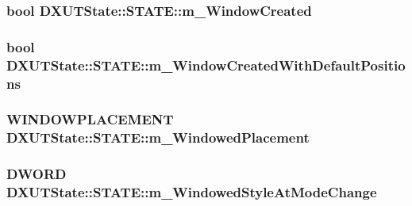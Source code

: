 \label{struct_d_x_u_t_state_1_1_s_t_a_t_e_ac091b80c8b43d3ace8727ec1a4f80739}
\hypertarget{struct_d_x_u_t_state_1_1_s_t_a_t_e_a1de1e982998068a26fb2f72bfdcecc0f}{
\subsubsection[{m\_\-WindowCreated}]{\setlength{\rightskip}{0pt plus 5cm}bool {\bf DXUTState::STATE::m\_\-WindowCreated}}}
\label{struct_d_x_u_t_state_1_1_s_t_a_t_e_a1de1e982998068a26fb2f72bfdcecc0f}
\hypertarget{struct_d_x_u_t_state_1_1_s_t_a_t_e_a1016f7d74385e9d74b86c6d8fe53176a}{
\subsubsection[{m\_\-WindowCreatedWithDefaultPositions}]{\setlength{\rightskip}{0pt plus 5cm}bool {\bf DXUTState::STATE::m\_\-WindowCreatedWithDefaultPositions}}}
\label{struct_d_x_u_t_state_1_1_s_t_a_t_e_a1016f7d74385e9d74b86c6d8fe53176a}
\hypertarget{struct_d_x_u_t_state_1_1_s_t_a_t_e_ad309dfdf17c0d15b5b0e154b91074eb9}{
\subsubsection[{m\_\-WindowedPlacement}]{\setlength{\rightskip}{0pt plus 5cm}WINDOWPLACEMENT {\bf DXUTState::STATE::m\_\-WindowedPlacement}}}
\label{struct_d_x_u_t_state_1_1_s_t_a_t_e_ad309dfdf17c0d15b5b0e154b91074eb9}
\hypertarget{struct_d_x_u_t_state_1_1_s_t_a_t_e_a87749bb43ec8abb327a2db7f7353f792}{
\subsubsection[{m\_\-WindowedStyleAtModeChange}]{\setlength{\rightskip}{0pt plus 5cm}DWORD {\bf DXUTState::STATE::m\_\-WindowedStyleAtModeChange}}}
